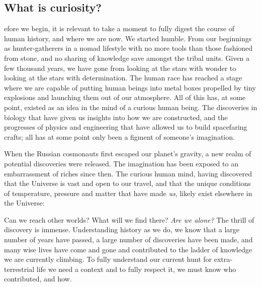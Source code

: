 \subsection{What is curiosity?}
efore we begin, it is relevant to take a moment to fully digest the course of human history, and where we are now.
We started humble.
From our beginnings as hunter-gatherers in a nomad lifestyle with no more tools than those fashioned from stone, and no sharing of knowledge save amongst the tribal units.
Given a few thousand years, we have gone from looking at the stars with wonder to looking at the stars with determination.
The human race has reached a stage where we are capable of putting human beings into metal boxes propelled by tiny explosions and launching them out of our atmosphere.
All of this has, at some point, existed as an idea in the mind of a curious human being.
The discoveries in biology that have given us insights into how we are constructed, and the progresses of physics and engineering that have allowed us to build spacefaring crafts; all has at some point only been a figment of someone's imagination.

When the Russian cosmonauts first escaped our planet's gravity, a new realm of potential discoveries were released.
The imagination has been exposed to an embarrassment of riches since then.
The curious human mind, having discovered that the Universe is vast and open to our travel, and that the unique conditions of temperature, pressure and matter that have made \textit{us}, likely exist elsewhere in the Universe:

Can we reach other worlds?
What will we find there?
\textit{Are we alone?}
The thrill of discovery is immense.
Understanding history as we do, we know that a large number of years have passed, a large number of discoveries have been made, and many wise lives have come and gone and contributed to the ladder of knowledge we are currently climbing.
To fully understand our current hunt for extra-terrestrial life we need a context and to fully respect it, we must know who contributed, and how.